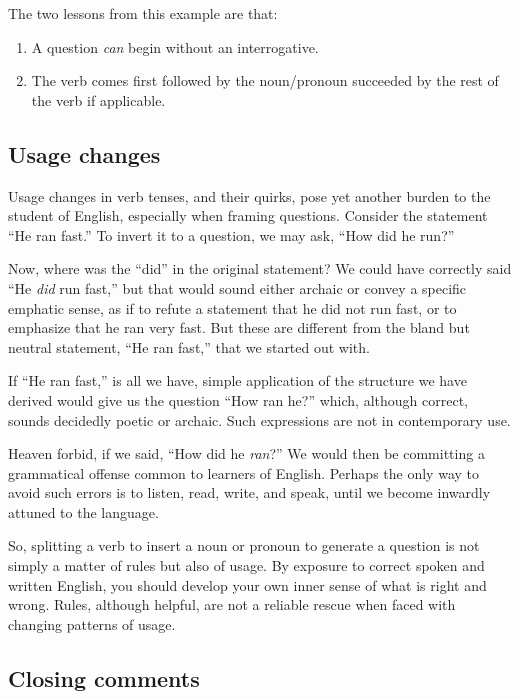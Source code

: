 \documentclass[
  12pt,
  a4paper,
]{article}
\begin{document}
The two lessons from this example are that:

\begin{enumerate}
\item
  A question \emph{can} begin without an interrogative.
\item
  The verb comes first followed by the noun/pronoun succeeded by the
  rest of the verb if applicable.
\end{enumerate}

\hypertarget{usage-changes}{%
\subsection{Usage changes}\label{usage-changes}}

Usage changes in verb tenses, and their quirks, pose yet another burden
to the student of English, especially when framing questions. Consider
the statement ``He ran fast.'' To invert it to a question, we may ask,
``How did he run?''

Now, where was the ``did'' in the original statement? We could have
correctly said ``He \emph{did} run fast,'' but that would sound either
archaic or convey a specific emphatic sense, as if to refute a statement
that he did not run fast, or to emphasize that he ran very fast. But
these are different from the bland but neutral statement, ``He ran
fast,'' that we started out with.

If ``He ran fast,'' is all we have, simple application of the structure
we have derived would give us the question ``How ran he?'' which,
although correct, sounds decidedly poetic or archaic. Such expressions
are not in contemporary use.

Heaven forbid, if we said, ``How did he \emph{ran}?'' We would then be
committing a grammatical offense common to learners of English. Perhaps
the only way to avoid such errors is to listen, read, write, and speak,
until we become inwardly attuned to the language.

So, splitting a verb to insert a noun or pronoun to generate a question
is not simply a matter of rules but also of usage. By exposure to
correct spoken and written English, you should develop your own inner
sense of what is right and wrong. Rules, although helpful, are not a
reliable rescue when faced with changing patterns of usage.

\hypertarget{closing-comments}{%
\subsection{Closing comments}\label{closing-comments}}
\end{document}
